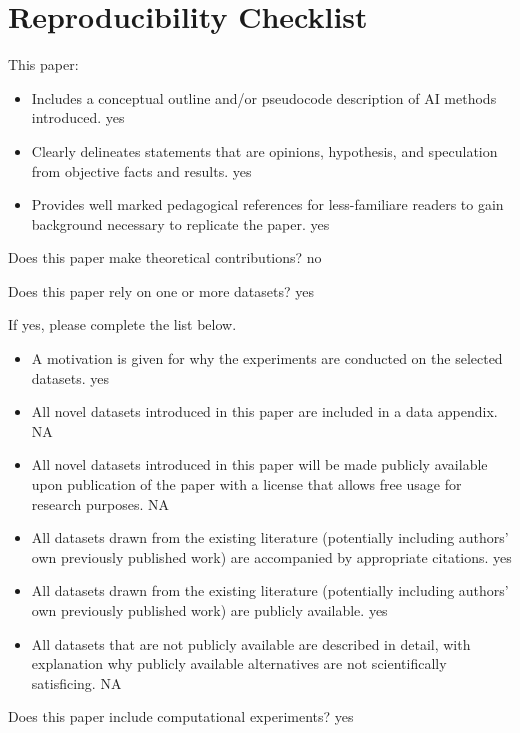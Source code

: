 \section{Reproducibility Checklist}
This paper:
\begin{itemize}
\item Includes a conceptual outline and/or pseudocode description of AI methods introduced. yes
\item Clearly delineates statements that are opinions, hypothesis, and speculation from objective facts and results. yes
\item Provides well marked pedagogical references for less-familiare readers to gain background necessary to replicate the paper. yes
\end{itemize}

\noindent Does this paper make theoretical contributions?  no

\noindent Does this paper rely on one or more datasets? yes

\noindent If yes, please complete the list below.
\begin{itemize}
\item A motivation is given for why the experiments are conducted on the selected datasets. yes 
\item All novel datasets introduced in this paper are included in a data appendix. NA
\item All novel datasets introduced in this paper will be made publicly available upon publication of the paper with a license that allows free usage for research purposes. NA
\item All datasets drawn from the existing literature (potentially including authors’ own previously published work) are accompanied by appropriate citations. yes
\item All datasets drawn from the existing literature (potentially including authors’ own previously published work) are publicly available. yes
\item All datasets that are not publicly available are described in detail, with explanation why publicly available alternatives are not scientifically satisficing. NA
\end{itemize}

\noindent Does this paper include computational experiments? yes

